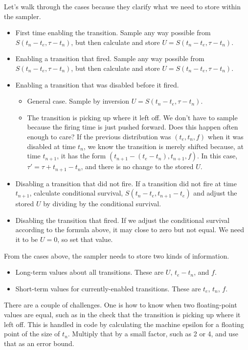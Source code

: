 \documentclass{article}
\begin{document}
Let's walk through the cases because they clarify what we need to store within the sampler.
\begin{itemize}
	\item First time enabling the transition. Sample any way possible from $S(t_n-t_e, \tau-t_n)$, but then calculate and store $U=S(t_n-t_e, \tau-t_n)$.
	\item Enabling a transition that fired. Sample any way possible from $S(t_n-t_e, \tau-t_n)$, but then calculate and store $U=S(t_n-t_e, \tau-t_n)$.

	\item Enabling a transition that was disabled before it fired.
	\begin{itemize}
		\item General case. Sample by inversion $U=S(t_n-t_e, \tau-t_n)$.
		\item The transition is picking up where it left off. We don't have to sample because the firing time is just pushed forward. Does this happen often enough to care? If the previous distribution was $(t_e, t_n, f)$ when it was disabled at time $t_n$, we know the transition is merely shifted because, at time $t_{n+1}$, it has the form $(t_{n+1}-(t_e-t_n), t_{n+1}, f)$. In this case, $\tau' = \tau + t_{n+1}-t_n$, and there is no change to the stored $U$.
	\end{itemize}
	\item Disabling a transition that did not fire. If a transition did not fire at time $t_{n+1}$, calculate conditional survival, $S(t_n-t_e, t_{n+1}-t_e)$ and adjust the stored $U$ by dividing by the conditional survival.
	\item Disabling the transition that fired. If we adjust the conditional survival according to the formula above, it may close to zero but not equal. We need it to be $U=0$, so set that value.
\end{itemize}
From the cases above, the sampler needs to store two kinds of information.
\begin{itemize}
	\item Long-term values about all transitions. These are $U$, $t_e-t_n$, and $f$.
	\item Short-term values for currently-enabled transitions. These are $t_e$, $t_n$, $f$.
\end{itemize}

There are a couple of challenges. One is how to know when two floating-point values are equal, such as in the check that the transition is picking up where it left off. This is handled in code by calculating the machine epsilon for a floating point of the size of $t_n$. Multiply that by a small factor, such as 2 or 4, and use that as an error bound.
\end{document}
